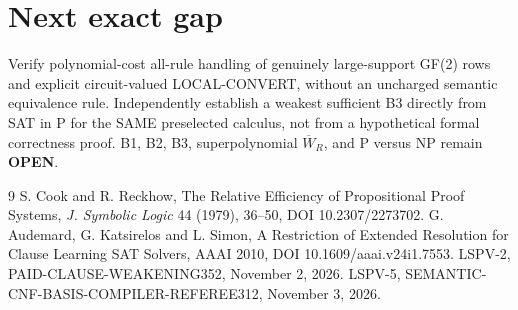 \documentclass[11pt]{article}
\begin{document}
\section*{Next exact gap}
Verify polynomial-cost all-rule handling of genuinely large-support GF(2) rows and explicit circuit-valued LOCAL-CONVERT, without an uncharged semantic equivalence rule. Independently establish a weakest sufficient B3 directly from SAT in P for the SAME preselected calculus, not from a hypothetical formal correctness proof. B1, B2, B3, superpolynomial $\overline W_R$, and P versus NP remain \textbf{OPEN}.
\begin{thebibliography}{9}
 S. Cook and R. Reckhow, The Relative Efficiency of Propositional Proof Systems, \emph{J. Symbolic Logic} 44 (1979), 36--50, DOI 10.2307/2273702.
 G. Audemard, G. Katsirelos and L. Simon, A Restriction of Extended Resolution for Clause Learning SAT Solvers, AAAI 2010, DOI 10.1609/aaai.v24i1.7553.
 LSPV-2, PAID-CLAUSE-WEAKENING352, November 2, 2026.
 LSPV-5, SEMANTIC-CNF-BASIS-COMPILER-REFEREE312, November 3, 2026.
\end{thebibliography}
\end{document}

